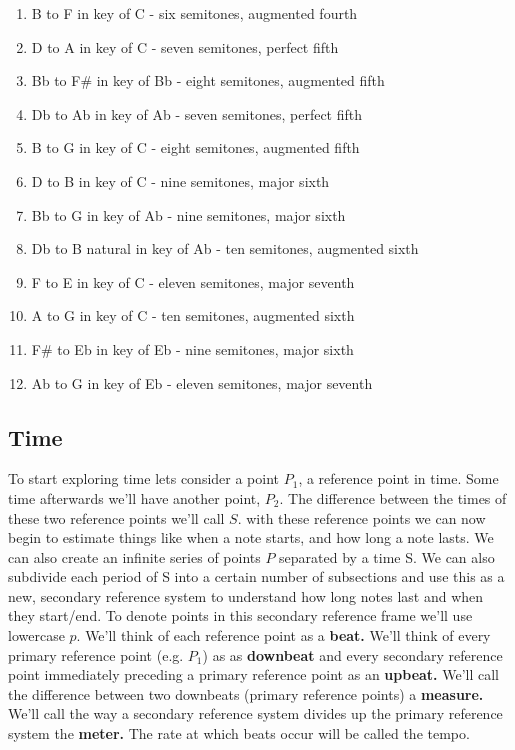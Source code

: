 \documentclass{article}
\begin{document}
\begin{enumerate}
\begin{enumerate}
      \item B to F in key of C - six semitones, augmented fourth
      \item D to A in key of C - seven semitones, perfect fifth
      \item Bb to F\# in key of Bb - eight semitones, augmented fifth
      \item Db to Ab in key of Ab - seven semitones, perfect fifth 
      \item B to G in key of C - eight semitones, augmented fifth
      \item D to B in key of C - nine semitones, major sixth
      \item Bb to G in key of Ab - nine semitones, major sixth
      \item Db to B natural in key of Ab - ten semitones, augmented sixth
      \item F to E in key of C - eleven semitones, major seventh
      \item A to G in key of C - ten semitones, augmented sixth
      \item F\# to Eb in key of Eb - nine semitones, major sixth
      \item Ab to G in key of Eb - eleven semitones, major seventh
    \end{enumerate}
\end{enumerate}
\subsection{Time}
To start exploring time lets consider a point $P_1$, a reference point in time. Some time afterwards we'll have another point, $P_2$. The difference between the times of these two reference points we'll call $S$. with these reference points we can now begin to estimate things like when a note starts, and how long a note lasts. We can also create an infinite series of points $P$ separated by a time S. We can also subdivide each period of S into a certain number of subsections and use this as a new, secondary reference system to understand how long notes last and when they start/end. To denote points in this secondary reference frame we'll use lowercase $p$. We'll think of each reference point as a \textbf{beat.} We'll think of every primary reference point (e.g. $P_1$) as as \textbf{downbeat} and every secondary reference point immediately preceding a primary reference point as an \textbf{upbeat.} We'll call the difference between two downbeats (primary reference points) a \textbf{measure.} We'll call the way a secondary reference system divides up the primary reference system the \textbf{meter.} The rate at which beats occur will be called the tempo.
\end{document}
